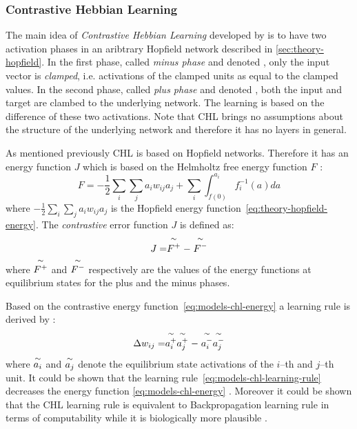 \def\myover#1#2{\mathrel{\overset{\makebox[0pt]{#2}}{#1}}}
\newcommand{\mytilde}{\raise.17ex\hbox{$\scriptstyle\mathtt{\sim}$}}
\def\myequi#1{\myover{#1}{\mytilde}}

\subsubsection{Contrastive Hebbian Learning}
\label{sec:models-chl} 

The main idea of \emph{Contrastive Hebbian Learning} developed by \citet{movellan1990contrastive} is to have two activation phases in an aribtrary Hopfield network \citep{hopfield1984neurons} described in \ref{sec:theory-hopfield}. In the first phase, called \emph{minus phase} and denoted \quotes{-}, only the input vector is \emph{clamped}, i.e. activations of the clamped units as equal to the clamped values. In the second phase, called \emph{plus phase} and denoted \quotes{+}, both the input and target are clambed to the underlying network. The learning is based on the difference of these two activations. Note that CHL brings no assumptions about the structure of the underlying network and therefore it has no layers in general. 

As mentioned previously CHL is based on Hopfield networks. Therefore it has an energy function $J$ which is based on the Helmholtz free energy function $F$ \citep{hinton1989deterministic}:
\begin{equation}
  \label{eq:models-chl-helmholtz}
  F = -\frac{1}{2}\sum_i\sum_ja_iw_{ij}a_j + \sum_i \int_{f(0)}^{a_i} f_i^{-1}(a)da
\end{equation} 
where $-\frac{1}{2}\sum_i\sum_ja_iw_{ij}a_j$ is the Hopfield energy function~\ref{eq:theory-hopfield-energy}. The \emph{contrastive} error function $J$ is defined as: 
\begin{equation}
  \label{eq:models-chl-energy}
  J = \myequi{F^{+}} - \myequi{F^{-}}
\end{equation} 
where $\myequi{F^{+}}$ and $\myequi{F^{-}}$ respectively are the values of the energy functions at equilibrium states for the plus and the minus phases. 

Based on the contrastive energy function~\ref{eq:models-chl-energy} a learning rule is derived by \citet{movellan1990contrastive}: 
\begin{equation}
  \label{eq:models-chl-learning-rule}
  \Delta w_{ij} = \myequi{a_i^{+}}\myequi{a_j^{+}} - \myequi{a_i^{-}}\myequi{a_j^{-}}
\end{equation}
where $\myequi{a_i}$ and $\myequi{a_j}$ denote the equilibrium state activations of the $i$--th and $j$--th unit. It could be shown that the learning rule~\ref{eq:models-chl-learning-rule} decreases the energy function \ref{eq:models-chl-energy} \citep{movellan1990contrastive}. Moreover it could be shown that the CHL learning rule is equivalent to Backpropagation learning rule in terms of computability while it is biologically more plausible \citep{o1996bio, xie2003equivalence}. 

   
